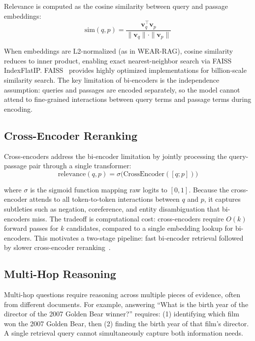 \documentclass[conference]{IEEEtran}
\begin{document}
Relevance is computed as the cosine similarity between query and passage embeddings:
\begin{equation}
\text{sim}(q, p) = \frac{\mathbf{v}_q^\top \mathbf{v}_p}{\|\mathbf{v}_q\| \cdot \|\mathbf{v}_p\|}
\end{equation}

When embeddings are L2-normalized (as in WEAR-RAG), cosine similarity reduces to inner product, enabling exact nearest-neighbor search via FAISS IndexFlatIP. FAISS~\cite{johnson2019faiss} provides highly optimized implementations for billion-scale similarity search. The key limitation of bi-encoders is the independence assumption: queries and passages are encoded separately, so the model cannot attend to fine-grained interactions between query terms and passage terms during encoding.

\subsection{Cross-Encoder Reranking}

Cross-encoders address the bi-encoder limitation by jointly processing the query-passage pair through a single transformer:
\begin{equation}
\text{relevance}(q, p) = \sigma\bigl(\text{CrossEncoder}([q; p])\bigr)
\end{equation}

where $\sigma$ is the sigmoid function mapping raw logits to $[0, 1]$. Because the cross-encoder attends to all token-to-token interactions between $q$ and $p$, it captures subtleties such as negation, coreference, and entity disambiguation that bi-encoders miss. The tradeoff is computational cost: cross-encoders require $O(k)$ forward passes for $k$ candidates, compared to a single embedding lookup for bi-encoders. This motivates a two-stage pipeline: fast bi-encoder retrieval followed by slower cross-encoder reranking~\cite{nogueira2019passage}.

\subsection{Multi-Hop Reasoning}

Multi-hop questions require reasoning across multiple pieces of evidence, often from different documents. For example, answering ``What is the birth year of the director of the 2007 Golden Bear winner?'' requires: (1) identifying which film won the 2007 Golden Bear, then (2) finding the birth year of that film's director. A single retrieval query cannot simultaneously capture both information needs.
\end{document}
